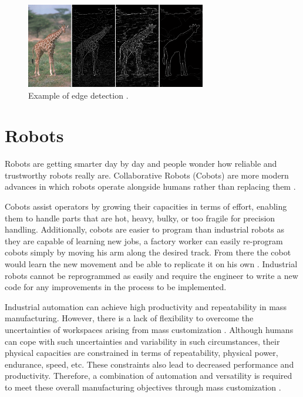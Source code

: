 \begin{figure}[ht]
  \centering
  \includegraphics[width=0.7\textwidth]{graphics/canny.png}
  \caption{Example of edge detection \cite{nalwa_edge_1993}.}
  \label{fig:edgedetection}
\end{figure}
\clearpage


\section{Robots}
Robots are getting smarter day by day and people wonder how reliable and trustworthy robots really are. Collaborative Robots (Cobots) are more modern advances in which robots operate alongside humans rather than replacing them \cite{pickett_dont_2018}. 

Cobots assist operators by growing their capacities in terms of effort, enabling them to handle parts that are hot, heavy, bulky, or too fragile for precision handling. Additionally, cobots are easier to program than industrial robots as they are capable of learning new jobs, a factory worker can easily re-program cobots simply by moving his arm along the desired track. From there the cobot would learn the new movement and be able to replicate it on his own \cite{schmidbauer_teaching_2020}. Industrial robots cannot be reprogrammed as easily and require the engineer to write a new code for any improvements in the process to be implemented.

Industrial automation can achieve high productivity and repeatability in mass manufacturing. However, there is a lack of flexibility to overcome the uncertainties of workspaces arising from mass customization \cite{accorsi_application_2019}. Although humans can cope with such uncertainties and variability in such circumstances, their physical capacities are constrained in terms of repeatability, physical power, endurance, speed, etc. These constraints also lead to decreased performance and productivity. Therefore, a combination of automation and versatility is required to meet these overall manufacturing objectives through mass customization \cite{zaatari_cobot_2019}.  

